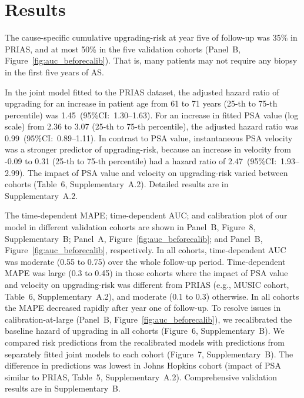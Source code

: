 \section{Results}
The cause-specific cumulative upgrading-risk at year five of follow-up was 35\% in PRIAS, and at most 50\% in the five validation cohorts (Panel~B, Figure~\ref{fig:auc_beforecalib}). That is, many patients may not require any biopsy in the first five years of AS.

In the joint model fitted to the PRIAS dataset, the adjusted hazard ratio of upgrading for an increase in patient age from 61 to 71 years (25-th to 75-th percentile) was 1.45~(95\%CI:~1.30--1.63). For an increase in fitted PSA value (log scale) from 2.36 to 3.07 (25-th to 75-th percentile), the adjusted hazard ratio was 0.99~(95\%CI:~0.89--1.11). In contrast to PSA value, instantaneous PSA velocity was a stronger predictor of upgrading-risk, because an increase in velocity from -0.09 to 0.31 (25-th to 75-th percentile) had a hazard ratio of 2.47~(95\%CI:~1.93--2.99). The impact of PSA value and velocity on upgrading-risk varied between cohorts (Table~6, Supplementary~A.2). Detailed results are in Supplementary~A.2.

The time-dependent MAPE; time-dependent AUC; and calibration plot of our model in different validation cohorts are shown in Panel~B, Figure~8, Supplementary~B; Panel~A, Figure~\ref{fig:auc_beforecalib}; and Panel~B, Figure~\ref{fig:auc_beforecalib}, respectively. In all cohorts, time-dependent AUC was moderate (0.55 to 0.75) over the whole follow-up period. Time-dependent MAPE was large (0.3 to 0.45) in those cohorts where the impact of PSA value and velocity on upgrading-risk was different from PRIAS (e.g., MUSIC cohort, Table~6, Supplementary~A.2), and moderate (0.1 to 0.3) otherwise. In all cohorts the MAPE decreased rapidly after year one of follow-up. To resolve issues in calibration-at-large (Panel~B, Figure~\ref{fig:auc_beforecalib}), we recalibrated the baseline hazard of upgrading in all cohorts (Figure~6, Supplementary~B). We compared risk predictions from the recalibrated models with predictions from separately fitted joint models to each cohort (Figure~7, Supplementary~B). The difference in predictions was lowest in Johns Hopkins cohort (impact of PSA similar to PRIAS, Table~5, Supplementary~A.2). Comprehensive validation results are in Supplementary~B.

